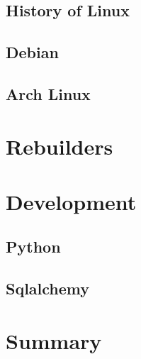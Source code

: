 \documentclass[../Main/thesis.tex]{subfiles}
\begin{document}
    \subsection*{History of Linux}
    \subsection*{Debian}
    \subsection*{Arch Linux}

\section{Rebuilders}\label{sec:rebuilders} 

\section{Development}\label{sec:python} 
    \subsection*{Python}
    \subsection*{Sqlalchemy}

\section{Summary}\label{sec:summary-theory} 

\blankpage
\end{document}
